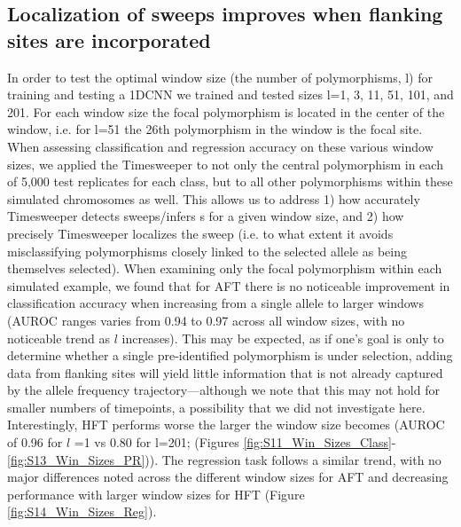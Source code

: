\subsection{Localization of sweeps improves when flanking sites are incorporated}

In order to test the optimal window size (the number of polymorphisms, l) for training and testing a 1DCNN we trained and tested sizes l=1, 3, 11, 51, 101, and 201. For each window size the focal polymorphism is located in the center of the window, i.e. for l=51 the 26th polymorphism in the window is the focal site. When assessing classification and regression accuracy on these various window sizes, we applied the Timesweeper to not only the central polymorphism in each of 5,000 test replicates for each class, but to all other polymorphisms within these simulated chromosomes as well. This allows us to address 1) how accurately Timesweeper detects sweeps/infers s for a given window size, and 2) how precisely Timesweeper localizes the sweep (i.e. to what extent it avoids misclassifying polymorphisms closely linked to the selected allele as being themselves selected). 
When examining only the focal polymorphism within each simulated example, we found that for AFT there is no noticeable improvement in classification accuracy when increasing from a single allele to larger windows (AUROC ranges varies from 0.94 to 0.97 across all window sizes, with no noticeable trend as $l$ increases). This may be expected, as if one’s goal is only to determine whether a single pre-identified polymorphism is under selection, adding data from flanking sites will yield little information that is not already captured by the allele frequency trajectory—although we note that this may not hold for smaller numbers of timepoints, a possibility that we did not investigate here. Interestingly, HFT performs worse the larger the window size becomes (AUROC of 0.96 for $l$ =1 vs 0.80 for l=201; (Figures \ref{fig:S11_Win_Sizes_Class}-\ref{fig:S13_Win_Sizes_PR})). The regression task follows a similar trend, with no major differences noted across the different window sizes for AFT and decreasing performance with larger window sizes for HFT (Figure \ref{fig:S14_Win_Sizes_Reg}).
